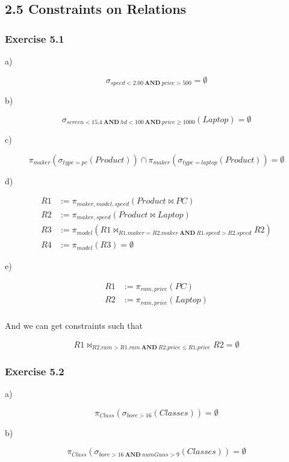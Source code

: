 \documentclass[../../main.tex]{subfiles}
\begin{document}
\subsection*{2.5 Constraints on Relations}

\subsubsection*{Exercise 5.1}

a)

$$
\sigma_{speed < 2.00 \ \mathbf{AND} \ price > 500} = \emptyset
$$

b)

$$
\sigma_{screen < 15.4 \ \mathbf{AND} \ hd < 100 \ \mathbf{AND} \
price \geq 1000}(Laptop) = \emptyset$$

c)

$$
\pi_{maker}(\sigma_{type=pc}(Product))
\cap \pi_{maker}(\sigma_{type=laptop}(
Product)) = \emptyset
$$

d)

\begin{align*}
  R1 &:= \pi_{maker, model, speed}(Product \bowtie PC) \\
  R2 &:= \pi_{maker, speed}(Product \bowtie Laptop) \\
  R3 &:= \pi_{model}(R1 \bowtie_{R1.maker=R2.maker \ \mathbf{AND} \
         R1.speed > R2.speed} R2) \\
  R4 &:= \pi_{model}(R3) = \emptyset
\end{align*}

e)

\begin{align*}
  R1 &:= \pi_{ram, price}(PC) \\
  R2 &:= \pi_{ram, price}(Laptop) \\
\end{align*}

And we can get constraints such that

$$
R1 \bowtie_{R2.ram > R1.ram \ \mathbf{AND} \
R2.price \leq R1.price} R2 = \emptyset
$$

\subsubsection*{Exercise 5.2}

a)

$$
\pi_{Class}(\sigma_{bore > 16}(Classes))
= \emptyset
$$

b)

$$
\pi_{Class}(\sigma_{bore > 16
\ \mathbf{AND} \ numGuns > 9}(Classes))= \emptyset
$$
\end{document}

